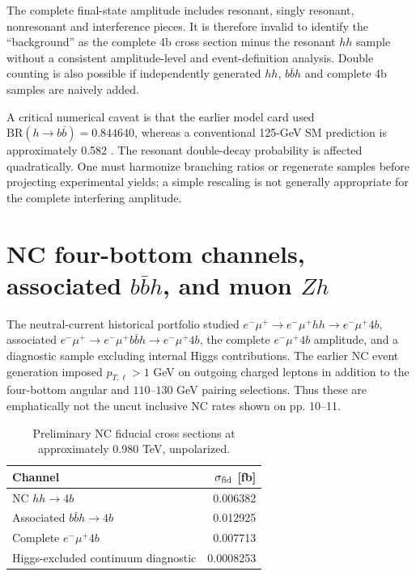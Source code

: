 \documentclass[12pt,a4paper]{article}
\newcommand{\newnote}{\clearpage}
\begin{document}
The complete final-state amplitude includes resonant, singly resonant, nonresonant and interference pieces. It is therefore invalid to identify the ``background'' as the complete 4b cross section minus the resonant $hh$ sample without a consistent amplitude-level and event-definition analysis. Double counting is also possible if independently generated $hh$, $b\bar b h$ and complete 4b samples are naively added.

A critical numerical caveat is that the earlier model card used $\mathrm{BR}(h\to b\bar b)=0.844640$, whereas a conventional 125-GeV SM prediction is approximately 0.582 \cite{pdg}. The resonant double-decay probability is affected quadratically. One must harmonize branching ratios or regenerate samples before projecting experimental yields; a simple rescaling is not generally appropriate for the complete interfering amplitude.





\newnote

\section{NC four-bottom channels, associated $b\bar b h$, and muon $Zh$}
The neutral-current historical portfolio studied $e^-\mu^+\to e^-\mu^+hh\to e^-\mu^+4b$, associated $e^-\mu^+\to e^-\mu^+b\bar b h\to e^-\mu^+4b$, the complete $e^-\mu^+4b$ amplitude, and a diagnostic sample excluding internal Higgs contributions. The earlier NC event generation imposed $p_{T,\ell}>1$ GeV on outgoing charged leptons in addition to the four-bottom angular and $110$--$130$ GeV pairing selections. Thus these are emphatically not the uncut inclusive NC rates shown on pp. 10--11.



\begin{table}[H]
\centering\small
\caption{Preliminary NC fiducial cross sections at approximately 0.980 TeV, unpolarized.}
\begin{tabular}{@{}lr@{}}\toprule Channel & $\sigma_{\rm fid}$ [fb]\\\midrule
NC $hh\to4b$ & 0.006382\\
Associated $b\bar b h\to4b$ & 0.012925\\
Complete $e^-\mu^+4b$ & 0.007713\\
Higgs-excluded continuum diagnostic & 0.0008253\\\bottomrule
\end{tabular}
\end{table}
\end{document}
